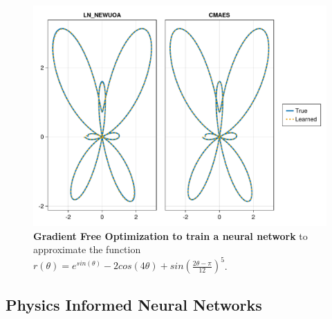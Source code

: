 \inputminted[linenos, breaklines, fontsize=\scriptsize, frame=single, framesep=10pt]{julia}{../code/gfopt.jl}

\begin{figure}[t]
  \centering
  \includegraphics[width=\textwidth]{../figures/lux/gfopt_plot.pdf}
  \caption{\textbf{Gradient Free Optimization to train a neural network} to approximate the function $r(\theta) = e^{sin(\theta)} - 2cos(4\theta) + sin\left(\frac{2\theta - \pi}{12}\right)^5$.}
  \label{fig:lux_gfopt_plot}
\end{figure}

\subsection{Physics Informed Neural Networks}
\label{subsec:physics_informed_neural_networks_lux}






